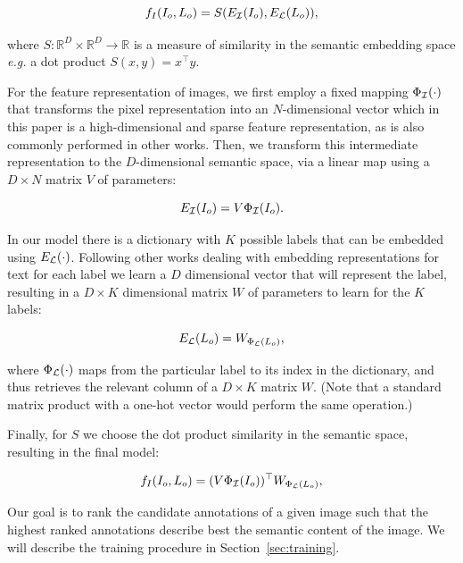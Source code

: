 \[ f_I(I_o, L_o) = S( E_{\cal I}(I_o), E_{\cal L}(L_o)), \] 

where $S : {\mathbb R}^{D}\times {\mathbb R}^{D} \rightarrow
{\mathbb R}$ is a measure of similarity in the semantic embedding space {\it
e.g.} a dot product $S(x,y)=x^\top y$.

For the feature representation of images, we first employ a fixed 
mapping $\Phi_{\cal I}(\cdot)$ that transforms the pixel representation
 into an $N$-dimensional vector which in this paper is a high-dimensional 
and sparse feature representation, as is also 
commonly performed in other works. %
Then, we transform this intermediate representation to the $D$-dimensional semantic space, via
a linear map using a  $D \times N$ matrix $V$ of parameters:

\[ E_{\cal I}(I_o)  = V \Phi_{\cal I}(I_o).\]

In our model there is a dictionary with $K$ possible labels that can be embedded
using $E_{\cal L}(\cdot)$.  Following other works dealing with embedding
representations for text \citep{Bengio-scholarpedia-2007,wsabie} for each label
we learn a $D$ dimensional vector that will represent the label, resulting in a
$D \times K$ dimensional matrix $W$ of parameters to learn for the $K$ labels:

\[ E_{\cal L}(L_o) = W_{\Phi_{\cal L}(L_o)}, \]

where $\Phi_{\cal L}(\cdot)$ maps from the particular label to its index in the
dictionary, and thus retrieves the relevant column of a $D \times K$ matrix
$W$. (Note that a
standard matrix product with a one-hot vector would perform the same operation.)

Finally, for $S$ we choose the dot product similarity in the semantic space, resulting in the final model:

\[ f_I(I_o, L_o) = (V \Phi_{\cal I}(I_o))^\top W_{\Phi_{\cal L}(L_o)},\]
  
Our goal is to rank the candidate annotations of a given image such
that the highest ranked annotations describe best the semantic content of
the image.  We will describe the training procedure in
Section~\ref{sec:training}.  

